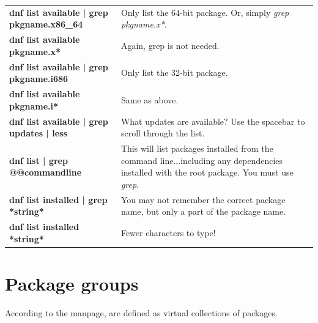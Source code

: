 \begin{tabularx}{\linewidth}{>{\bfseries}X | X}
dnf list available | grep pkgname.x86\_64 & Only list the 64-bit package. Or, simply \emph{grep pkgname.x*}.\\[2mm]
dnf list available pkgname.x* & Again, grep is not needed.\\[2mm]
dnf list available | grep pkgname.i686 & Only list the 32-bit package.\\[2mm]
dnf list available pkgname.i* & Same as above.\\[2mm]
dnf list available | grep updates | less & What updates are available? Use the spacebar to scroll through the list.\\[2mm]
dnf list | grep @@commandline & This will list packages installed from the command line...including any dependencies installed with the root package. You must use \emph{grep}.\\[2mm]
dnf list installed | grep *string* & You may not remember the correct package name, but only a part of the package name.\\[2mm]
dnf list installed *string* & Fewer characters to type!\\[3mm]
\bottomrule
\end{tabularx}

\section{Package groups}

According to the  manpage,  are defined as virtual collections of packages. 

